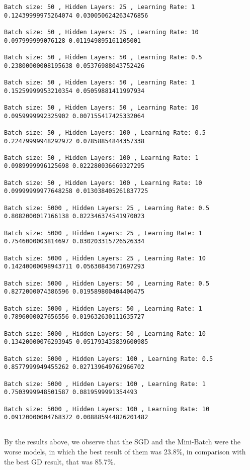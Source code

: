\documentclass[11pt]{article}
\begin{document}
\begin{Verbatim}[commandchars=\\\{\}]
Batch size: 50 , Hidden Layers: 25 , Learning Rate: 1
0.12439999975264074 0.030050624263476856

Batch size: 50 , Hidden Layers: 25 , Learning Rate: 10
0.097999999076128 0.011949895161105001

Batch size: 50 , Hidden Layers: 50 , Learning Rate: 0.5
0.23800000008195638 0.05376988043752426

Batch size: 50 , Hidden Layers: 50 , Learning Rate: 1
0.15259999953210354 0.05059881411997934

Batch size: 50 , Hidden Layers: 50 , Learning Rate: 10
0.0959999992325902 0.007155417425332064

Batch size: 50 , Hidden Layers: 100 , Learning Rate: 0.5
0.22479999948292972 0.07858854844357338

Batch size: 50 , Hidden Layers: 100 , Learning Rate: 1
0.0989999996125698 0.022280036669327295

Batch size: 50 , Hidden Layers: 100 , Learning Rate: 10
0.09999999977648258 0.013038405261837725

Batch size: 5000 , Hidden Layers: 25 , Learning Rate: 0.5
0.8082000017166138 0.022346374541970023

Batch size: 5000 , Hidden Layers: 25 , Learning Rate: 1
0.7546000003814697 0.030203315726526334

Batch size: 5000 , Hidden Layers: 25 , Learning Rate: 10
0.14240000098943711 0.05630843671697293

Batch size: 5000 , Hidden Layers: 50 , Learning Rate: 0.5
0.8272000074386596 0.019589800404406475

Batch size: 5000 , Hidden Layers: 50 , Learning Rate: 1
0.7896000027656556 0.019632630111635727

Batch size: 5000 , Hidden Layers: 50 , Learning Rate: 10
0.13420000076293945 0.051793435839600985

Batch size: 5000 , Hidden Layers: 100 , Learning Rate: 0.5
0.8577999949455262 0.027139649762966702

Batch size: 5000 , Hidden Layers: 100 , Learning Rate: 1
0.7503999948501587 0.0819599991354493

Batch size: 5000 , Hidden Layers: 100 , Learning Rate: 10
0.09120000004768372 0.008885944826201482


    \end{Verbatim}

    By the results above, we observe that the SGD and the Mini-Batch were
the worse models, in which the best result of them was 23.8\%, in
comparison with the best GD result, that was 85.7\%.
\end{document}
